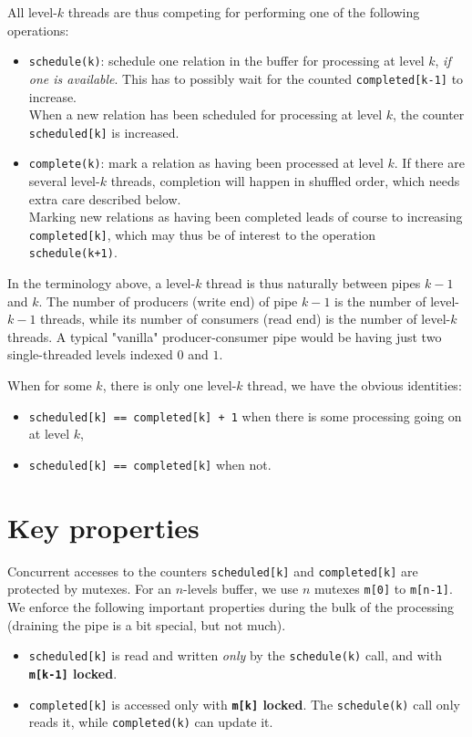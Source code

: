 \documentclass[10pt]{article}
\def\code#1{\texttt{#1}}
\begin{document}
All level-$k$ threads are thus competing for performing one of the
following operations:
\begin{itemize}
    \item \code{schedule(k)}: schedule one relation in the buffer for
        processing at level $k$, \emph{if one is available}. This has to
        possibly wait for the counted \verb|completed[k-1]| to
        increase.\\
        When a new relation has been scheduled for processing at level
        $k$, the counter \verb|scheduled[k]| is increased.
    \item \code{complete(k)}: mark a relation as having been processed at
        level $k$. If there are several level-$k$ threads, completion
        will happen in shuffled order, which needs extra care described
        below.\\
        Marking new relations as having been completed leads of
        course to increasing \verb|completed[k]|, which may thus be of
        interest to the operation \code{schedule(k+1)}.
\end{itemize}

In the terminology above, a level-$k$ thread is thus naturally between
pipes $k-1$ and $k$. The number of producers (write end) of pipe $k-1$ is
the number of level-$k-1$ threads, while its number of consumers (read
end) is the number of level-$k$ threads. A typical "vanilla"
producer-consumer pipe would be having just two single-threaded levels
indexed $0$ and $1$.

When for some $k$, there is only one level-$k$ thread, we have the
obvious identities:
\begin{itemize}
    \item \verb|scheduled[k] == completed[k] + 1| when there is
some processing going on at level $k$,
    \item \verb|scheduled[k] == completed[k]| when not.
\end{itemize}


\section{Key properties}

Concurrent accesses to the counters \verb|scheduled[k]| and
\verb|completed[k]| are protected by mutexes. For an $n$-levels buffer,
we use $n$ mutexes \verb|m[0]| to \verb|m[n-1]|.  We enforce the
following important properties during the bulk of the processing
(draining the pipe is a bit special, but not much).
\begin{itemize}
    \item \verb|scheduled[k]| is read and written \emph{only} by the
        \code{schedule(k)} call, and with {\bfseries \verb|m[k-1]| locked}.
    \item \verb|completed[k]| is accessed only with {\bfseries
        \verb|m[k]| locked}. The \code{schedule(k)} call only reads it,
        while \code{completed(k)} can update it.
\end{itemize}
\end{document}
